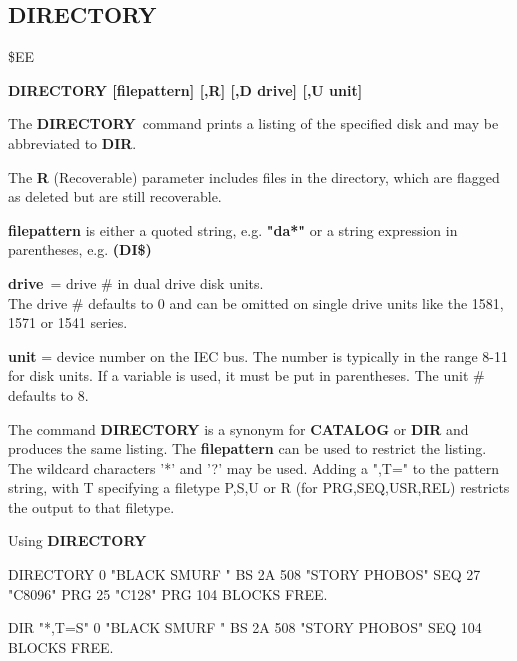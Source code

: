 \subsection{DIRECTORY}
\begin{description}[leftmargin=3cm,style=nextline]
\item [Token:] \$EE
\item [Format:] {\bf DIRECTORY [filepattern] [,R] [,D drive] [,U unit] }
\item [Usage:]
   The {\bf DIRECTORY} command prints a listing
   of the specified disk and may be abbreviated to {\bf DIR}.

   The {\bf R} (Recoverable) parameter includes files in the
   directory, which are flagged as deleted but are still
   recoverable.

   {\bf filepattern} is either a quoted string, e.g. {\bf "da*"} or
   a string expression in parentheses, e.g. {\bf (DI\$)}

   {\bf drive} = drive \# in dual drive disk units. \\
   The drive \# defaults to 0 and can be omitted on single drive units
   like the 1581, 1571 or 1541 series.

   {\bf unit} = device number on the IEC bus.
   The number is typically in the range 8-11 for disk units.
   If a variable is used, it must be put in parentheses.
   The unit \# defaults to 8.

\item [Remarks:]
   The command {\bf DIRECTORY} is a synonym for {\bf CATALOG}
   or {\bf DIR} and produces the same listing.
   The {\bf filepattern} can be used to restrict the listing.
   The wildcard characters '*' and '?' may be used.
   Adding a ",T=" to the pattern string, with T specifying
   a filetype P,S,U or R (for PRG,SEQ,USR,REL) restricts the
   output to that filetype.

\item [Example:] Using {\bf DIRECTORY}
\begin{screenoutput}
DIRECTORY
  0 "BLACK SMURF     " BS  2A
508 "STORY PHOBOS"         SEQ
27  "C8096"                PRG
25  "C128"                 PRG
104 BLOCKS FREE.

DIR "*,T=S"
  0 "BLACK SMURF     " BS  2A
508 "STORY PHOBOS"         SEQ
104 BLOCKS FREE.
\end{screenoutput}
\end{description}


\newpage
